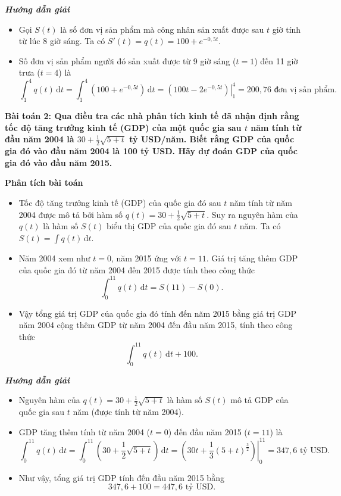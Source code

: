 \documentclass[12pt,a4paper]{article}
\newcommand{\dd}{\,\mathrm{d}}
\newcommand{\analysis}{\noindent\raisebox{0.15ex}{\rule{1.6ex}{1.6ex}}\hspace{4pt}\textbf{Phân tích bài toán}\par}
\newcommand{\solution}{\begin{center}\textbf{\textit{Hướng dẫn giải}}\end{center}\par}
\begin{document}
\solution
\begin{itemize}
\item Gọi $S(t)$ là số đơn vị sản phẩm mà công nhân sản xuất được sau $t$ giờ tính từ lúc 8 giờ sáng. Ta có $S'(t)=q(t)=100+e^{-0,5t}$.
\item Số đơn vị sản phẩm người đó sản xuất được từ 9 giờ sáng ($t=1$) đến 11 giờ trưa ($t=4$) là
\[
\int_1^4q(t)\dd t
=\int_1^4(100+e^{-0,5t})\dd t
=\left.\left(100t-2e^{-0{,}5t}\right)\right|_1^4
=200,76\text{ đơn vị sản phẩm}.
\]
\end{itemize}

\textbf{Bài toán 2: Qua điều tra các nhà phân tích kinh tế đã nhận định rằng tốc độ tăng trưởng kinh tế (GDP) của một quốc gia sau $t$ năm tính từ đầu năm 2004 là $30+\frac12\sqrt{5+t}$ tỷ USD/năm. Biết rằng GDP của quốc gia đó vào đầu năm 2004 là 100 tỷ USD. Hãy dự đoán GDP của quốc gia đó vào đầu năm 2015.}\par\medskip
\begin{analysisbox}
\analysis
\begin{itemize}
\item Tốc độ tăng trưởng kinh tế (GDP) của quốc gia đó sau $t$ năm tính từ năm 2004 được mô tả bởi hàm số $q(t)=30+\frac12\sqrt{5+t}$. Suy ra nguyên hàm của $q(t)$ là hàm số $S(t)$ biểu thị GDP của quốc gia đó sau $t$ năm. Ta có $S(t)=\int q(t)\dd t$.
\item Năm 2004 xem như $t=0$, năm 2015 ứng với $t=11$. Giá trị tăng thêm GDP của quốc gia đó từ năm 2004 đến 2015 được tính theo công thức
\[
\int_0^{11}q(t)\dd t=S(11)-S(0).
\]
\item Vậy tổng giá trị GDP của quốc gia đó tính đến năm 2015 bằng giá trị GDP năm 2004 cộng thêm GDP từ năm 2004 đến đầu năm 2015, tính theo công thức
\[
\int_0^{11}q(t)\dd t+100.
\]
\end{itemize}
\end{analysisbox}

\solution
\begin{itemize}
\item Nguyên hàm của $q(t)=30+\frac12\sqrt{5+t}$ là hàm số $S(t)$ mô tả GDP của quốc gia sau $t$ năm (được tính từ năm 2004).
\item GDP tăng thêm tính từ năm 2004 ($t=0$) đến đầu năm 2015 ($t=11$) là
\[
\int_0^{11}q(t)\dd t
=\int_0^{11}\left(30+\frac12\sqrt{5+t}\right)\dd t
=\left.\left(30t+\frac{1}{3}(5+t)^{\frac{3}{2}}\right)\right|_0^{11}
=347,6\text{ tỷ USD}.
\]
\item Như vậy, tổng giá trị GDP tính đến đầu năm 2015 bằng
\[
347,6+100=447,6\text{ tỷ USD}.
\]
\end{itemize}
\end{document}
